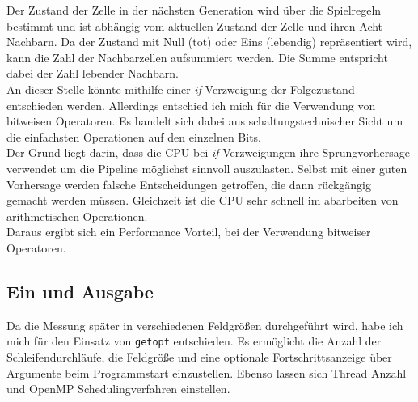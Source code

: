 \documentclass[german,plainarticle,hyperref,utf8]{zihpub}
\begin{document}
	Der Zustand der Zelle in der nächsten Generation wird über die Spielregeln bestimmt und ist abhängig vom aktuellen Zustand der Zelle und ihren Acht Nachbarn. Da der Zustand mit Null (tot) oder Eins (lebendig) repräsentiert wird, kann die Zahl der Nachbarzellen aufsummiert werden. Die Summe entspricht dabei der Zahl lebender Nachbarn.\\
	An dieser Stelle könnte mithilfe einer \textit{if}-Verzweigung der Folgezustand entschieden werden. Allerdings entschied ich mich für die Verwendung von bitweisen Operatoren. Es handelt sich dabei aus schaltungstechnischer Sicht um die einfachsten Operationen auf den einzelnen Bits.\\
	Der Grund liegt darin, dass die CPU bei \textit{if}-Verzweigungen ihre Sprungvorhersage verwendet um die Pipeline möglichst sinnvoll auszulasten. Selbst mit einer guten Vorhersage werden falsche Entscheidungen getroffen, die dann rückgängig gemacht werden müssen. Gleichzeit ist die CPU sehr schnell im abarbeiten von arithmetischen Operationen.\\
	Daraus ergibt sich ein Performance Vorteil, bei der Verwendung bitweiser Operatoren.	

	\subsection{Ein und Ausgabe}
	Da die Messung später in verschiedenen Feldgrößen durchgeführt wird, habe ich mich für den Einsatz von \verb|getopt| entschieden. Es ermöglicht die Anzahl der Schleifendurchläufe, die Feldgröße und eine optionale Fortschrittsanzeige über Argumente beim Programmstart einzustellen.
	Ebenso lassen sich Thread Anzahl und OpenMP Schedulingverfahren einstellen.
	
	

\end{document}
